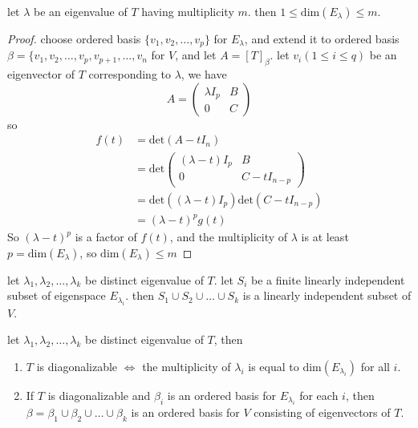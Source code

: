 \begin{theorem}
    let $\lambda$ be an eigenvalue of $T$ having multiplicity $m$. then $1 \leq \text{dim}(E_\lambda) \leq m$.
\end{theorem}
\begin{proof}
    choose ordered basis $\{v_1, v_2, \dots, v_p\}$ for $E_\lambda$, and extend it to ordered basis $\beta = \{ v_1, v_2, \dots, v_p, v_{p+1}, \dots, v_n$ for $V$, and let $A = [T]_\beta$. let $v_i (1 \leq i \leq q)$ be an eigenvector of $T$ corresponding to $\lambda$, we have
    \begin{equation*}
        A = \begin{pmatrix}
            \lambda I_p & B \\
            0 & C
        \end{pmatrix}
    \end{equation*}
    so \begin{equation*}
        \begin{aligned}
            f(t) &= \text{det}(A - t I_n) \\
            &= \text{det} \begin{pmatrix}
                (\lambda - t) I_p & B \\
                0 & C - t I_{n-p}
            \end{pmatrix} \\
            &= \text{det}((\lambda - t)I_p) \text{det}(C - t I_{n-p}) \\
            &= (\lambda - t)^p g(t)
        \end{aligned}
        \end{equation*}
    So $(\lambda - t)^p$ is a factor of $f(t)$, and the multiplicity of $\lambda$ is at least $p = \text{dim}(E_\lambda)$, so $\text{dim}(E_\lambda) \leq m$ 
\end{proof}

\begin{theorem}
    let $\lambda_1, \lambda_2, \dots, \lambda_k$ be distinct eigenvalue of $T$. let $S_i$ be a finite linearly independent subset of eigenspace $E_{\lambda_i}$. then $S_1 \cup S_2 \cup \dots \cup S_k$ is a linearly independent subset of $V$.
\end{theorem}

\begin{theorem}
    let $\lambda_1, \lambda_2, \dots, \lambda_k$ be distinct eigenvalue of $T$, then
    \begin{enumerate}
        \item $T$ is diagonalizable $\iff$ the multiplicity of $\lambda_i$ is equal to $\text{dim}(E_{\lambda_i})$ for all $i$.
        \item If $T$ is diagonalizable and $\beta_i$ is an ordered basis for $E_{\lambda_i}$ for each $i$, then $\beta = \beta_1 \cup \beta_2 \cup \dots \cup \beta_k$ is an ordered basis for $V$ consisting of eigenvectors of $T$.
    \end{enumerate}
\end{theorem}

